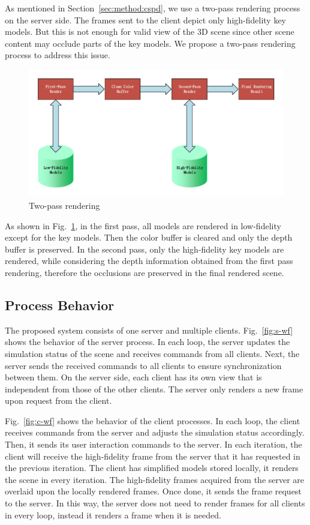 As mentioned in Section~\ref{sec:method:cspd}, we use a two-pass rendering process on the server side.
The frames sent to the client depict only high-fidelity key models.
But this is not enough for valid view of the 3D scene since other scene content may occlude parts of the key models.
We propose a two-pass rendering process to address this issue.

\begin{figure}[!htbp]
	\includegraphics[width=\textwidth]{figures/two-pass-rendering.pdf}
	\caption{Two-pass rendering}
	\label{fig:tp-rendering}
\end{figure}

As shown in Fig.~\ref{fig:tp-rendering}, in the first pass, all models are rendered in low-fidelity except for the key models. Then the color buffer is cleared and only the depth buffer is preserved. In the second pass, only the high-fidelity key models are rendered, while considering the depth information obtained from the first pass rendering, therefore the occlusions are preserved in the final rendered scene.

\subsection{Process Behavior}

The proposed system consists of one server and multiple clients.
Fig.~\ref{fig:s-wf} shows the behavior of the server process.
In each loop, the server updates the simulation status of the scene and receives commands from all clients.
Next, the server sends the received commands to all clients to ensure synchronization between them.
On the server side, each client has its own view that is independent from those of the other clients.
The server only renders a new frame upon request from the client.

Fig.~\ref{fig:c-wf} shows the behavior of the client processes. In each loop, the client receives commands from the server and adjusts the simulation status accordingly. Then, it sends its user interaction commands to the server. In each iteration, the client will receive the high-fidelity frame from the server that it has requested in the previous iteration. The client has simplified models stored locally, it renders the scene in every iteration. The high-fidelity frames acquired from the server are overlaid upon the locally rendered frames. Once done, it sends the frame request to the server. In this way, the server does not need to render frames for all clients in every loop, instead it renders a frame when it is needed.

